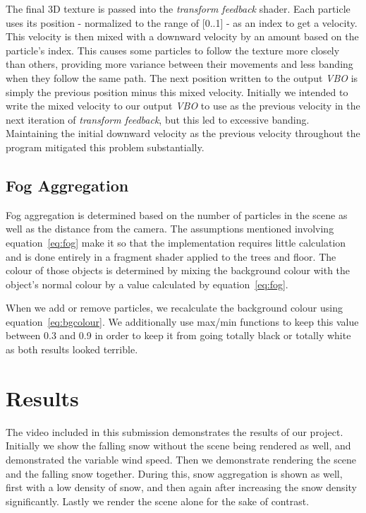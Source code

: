 \documentclass[conference]{acmsiggraph}
\begin{document}
The final 3D texture is passed into the \textit{transform feedback} shader. Each particle uses its position - normalized to the range of [0..1] -  as an index to get a velocity. This velocity is then mixed with a downward velocity by an amount based on the particle's index. This causes some particles to follow the texture more closely than others, providing more variance between their movements and less banding when they follow the same path. The next position written to the output \textit{VBO} is simply the previous position minus this mixed velocity. Initially we intended to write the mixed velocity to our output \textit{VBO} to use as the previous velocity in the next iteration of \textit{transform feedback}, but this led to excessive banding. Maintaining the initial downward velocity as the previous velocity throughout the program mitigated this problem substantially.

\subsection{Fog Aggregation}
Fog aggregation is determined based on the number of particles in the scene as well as the distance from the camera. The assumptions mentioned involving equation~\ref{eq:fog} make it so that the implementation requires little calculation and is done entirely in a fragment shader applied to the trees and floor. The colour of those objects is determined by mixing the background colour with the object's normal colour by a value calculated by equation~\ref{eq:fog}.

When we add or remove particles, we recalculate the background colour using equation~\ref{eq:bgcolour}. We additionally use max/min functions to keep this value between 0.3 and 0.9 in order to keep it from going totally black or totally white as both results looked terrible.

\section{Results}
The video included in this submission demonstrates the results of our project. Initially we show the falling snow without the scene being rendered as well, and demonstrated the variable wind speed. Then we demonstrate rendering the scene and the falling snow together. During this, snow aggregation is shown as well, first with a low density of snow, and then again after increasing the snow density significantly. Lastly we render the scene alone for the sake of contrast. 
\end{document}
